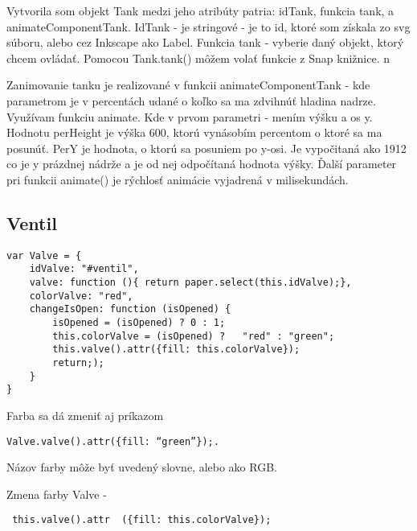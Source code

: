 Vytvorila som objekt Tank medzi jeho atribúty patria: idTank, funkcia tank, a animateComponentTank. IdTank - je stringové - je to id, ktoré som získala zo svg súboru, alebo cez Inkscape ako Label. Funkcia tank - vyberie daný objekt, ktorý chcem ovládať. Pomocou Tank.tank() môžem volať funkcie z Snap knižnice. n 

Zanimovanie tanku je realizované v funkcii animateComponentTank - kde parametrom je v percentách udané o koľko sa ma zdvihnúť hladina nadrze. 
Využívam funkciu animate. Kde v prvom parametri - mením výšku a os y. Hodnotu perHeight je výška 600, ktorú vynásobím percentom o ktoré sa ma posunúť. PerY je hodnota, o ktorú sa posuniem po y-osi. Je vypočitaná ako 1912 co je y prázdnej nádrže a je od nej odpočítaná hodnota výšky. 
Ďalší parameter pri funkcii animate() je rýchlosť animácie vyjadrená v milisekundách.

\subsection{Ventil}

\begin{lstlisting}
var Valve = {
	idValve: "#ventil",
	valve: function (){ return paper.select(this.idValve);},
	colorValve: "red",
	changeIsOpen: function (isOpened) {
		isOpened = (isOpened) ? 0 : 1;
		this.colorValve = (isOpened) ?   "red" : "green";
		this.valve().attr({fill: this.colorValve});
		return;);
	}
}
\end{lstlisting}

Farba sa dá zmeniť aj príkazom 

\begin{verbatim}
Valve.valve().attr({fill: “green”});.
\end{verbatim}

Názov farby môže byť uvedený slovne, alebo ako RGB. 

Zmena farby Valve - \begin{verbatim} this.valve().attr  ({fill: this.colorValve}); \end{verbatim}

